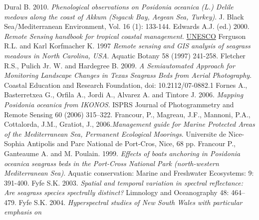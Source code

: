 \documentclass[11pt]{article}
\begin{document}
\begin{thebibliography}{999}
Dural B. 2010. \emph{Phenological observations on \textit{Posidonia oceanica} (L.) Delile medows
along the coast of Akkum (Sıgacık Bay, Aegean Sea, Turkey)}. J. Black Sea/Mediterranean
Environment, Vol. 16 (1): 133-144. \pageref{Dural10}
Edwards A.J. (ed.) 2000. \emph{Remote Sensing handbook for tropical coastal management}.
\href{http://www.unesco.org/csi/pub/source/rs.htm}{UNESCO} \pageref{Edwards00}
Ferguson R.L. and Karl Korfmacher K. 1997 \emph{Remote sensing and GIS analysis of seagrass meadows in North Carolina, USA}. Aquatic Botany 58 (1997) 241-258. \pageref{Ferguson97}
Fletcher R.S., Pulich Jr. W. and Hardegree B. 2009. \emph{A Semiautomated Approach for Monitoring Landscape Changes in Texas Seagrass Beds from Aerial Photography}. Coastal
Education and Research Foundation, doi: 10.2112/07-0882.1 \pageref{Fletcher09}
Fornes A., Basterretxea G., Orfila A., Jordi A., Alvarez A. and Tintore J. 2006. \emph{Mapping
\textit{Posidonia oceanica} from IKONOS}. ISPRS Journal of Photogrammetry and Remote Sensing
60 (2006) 315–322. \pageref{Fornes06}
Francour, P., Magreau, J.F., Mannoni, P.A., Cottalorda, J.M., Gratiot, J., 2006.\emph{Management guide for Marine Protected Areas of the Mediterranean Sea, Permanent Ecological Moorings}. Universite de Nice-Sophia Antipolis and Parc National de Port-Cros,
Nice, 68 pp. \pageref{Francour06}
Francour P., Ganteaume A. and M. Poulain. 1999. \emph{Effects of boats anchoring in \textit{Posidonia oceanica} seagrass beds in the Port-Cross National Park (north-western
Mediterranean Sea)}. Aquatic conservation: Marine and Freshwater Ecosystems: 9: 391-400. \pageref{Francour99}
Fyfe S.K. 2003. \emph{Spatial and temporal variation in spectral reflectance: Are seagrass
species spectrally distinct?} Limnology and Oceanography 48: 464–479. \pageref{Fyfe03}
Fyfe S.K. 2004. \emph{Hyperspectral studies of New South Wales with particular emphasis on
}
\end{thebibliography}
\end{document}
